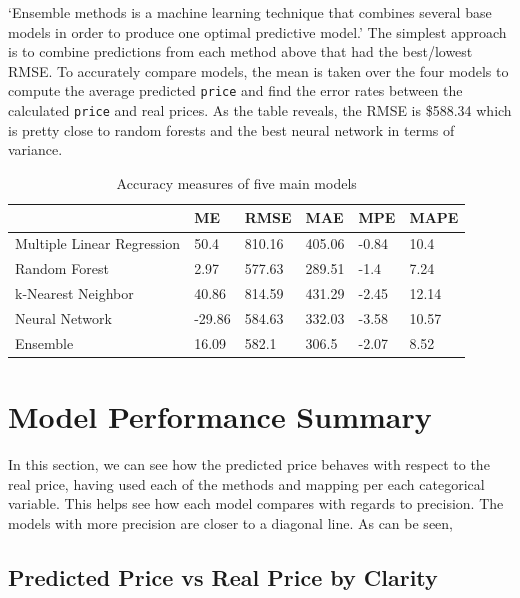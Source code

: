 \documentclass[
  paper=a4,
  ,captions=tableheading
]{scrartcl}
\begin{document}
`Ensemble methods is a machine learning technique that combines several
base models in order to produce one optimal predictive model.' The
simplest approach is to combine predictions from each method above that
had the best/lowest RMSE. To accurately compare models, the mean is
taken over the four models to compute the average predicted
\texttt{price} and find the error rates between the calculated
\texttt{price} and real prices. As the table reveals, the RMSE is
\$588.34 which is pretty close to random forests and the best neural
network in terms of variance.

\begin{table}[!h]

\caption{\label{tab:ensemble error table}Accuracy measures of five main models}
\centering
\begin{tabu} to 
\hline
  & ME & RMSE & MAE & MPE & MAPE\\
\hline
Multiple Linear Regression & 50.4 & 810.16 & 405.06 & -0.84 & 10.4\\
\hline
Random Forest & 2.97 & 577.63 & 289.51 & -1.4 & 7.24\\
\hline
k-Nearest Neighbor & 40.86 & 814.59 & 431.29 & -2.45 & 12.14\\
\hline
Neural Network & -29.86 & 584.63 & 332.03 & -3.58 & 10.57\\
\hline
Ensemble & 16.09 & 582.1 & 306.5 & -2.07 & 8.52\\
\hline
\end{tabu}
\end{table}

\hypertarget{model-performance-summary}{%
\section{Model Performance Summary}\label{model-performance-summary}}

In this section, we can see how the predicted price behaves with respect
to the real price, having used each of the methods and mapping per each
categorical variable. This helps see how each model compares with
regards to precision. The models with more precision are closer to a
diagonal line. As can be seen,

\hypertarget{predicted-price-vs-real-price-by-clarity}{%
\subsection{Predicted Price vs Real Price by
Clarity}\label{predicted-price-vs-real-price-by-clarity}}
\end{document}
